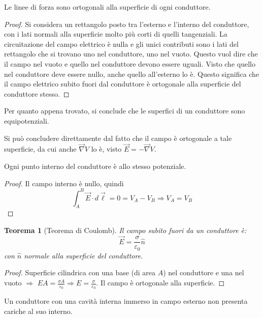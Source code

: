 \documentclass[10pt, a4paper]{scrartcl}
\numberwithin{equation}{subsection}
\theoremstyle{style1}
\newtheorem{teorema}{Teorema}[section]
\newenvironment{boxenv}[1][]{
    \begin{eqbox}[#1]
    }{
   \end{eqbox}
}
\begin{document}
Le linee di forza sono ortogonali alla superficie di ogni conduttore.
\begin{boxenv}[]
\begin{proof}
	Si considera un rettangolo posto tra l'esterno e l'interno del conduttore, con i lati normali alla superficie molto pi\`u corti di quelli tangenziali. La circuitazione del campo elettrico \`e nulla e gli unici contributi sono i lati del rettangolo che si trovano uno nel conduttore, uno nel vuoto. Questo vuol dire che il campo nel vuoto e quello nel conduttore devono essere uguali. Visto che quello nel conduttore deve essere nullo, anche quello all'esterno lo \`e. Questo significa che il campo elettrico subito fuori dal conduttore \`e ortogonale alla superficie del conduttore stesso.
\end{proof}
\end{boxenv}
\noindent Per quanto appena trovato, si conclude che le superfici di un conduttore sono equipotenziali.
\begin{boxenv}[]
	Si pu\`o concludere direttamente dal fatto che il campo \`e ortogonale a tale superficie, da cui anche $\vec{\nabla }V$ lo \`e, visto $\vec{E} = - \vec{\nabla }V$.
\end{boxenv}
\noindent Ogni punto interno del conduttore \`e allo stesso potenziale.
\begin{boxenv}
	\begin{proof}
		Il campo interno \`e nullo, quindi 
		\[
		\int_{A} ^B \vec{E}\cdot d\vec{\ell } = 0 = V_A - V_B \Rightarrow V_A = V_B
		\] 
	\end{proof}
\end{boxenv}
\begin{teorema}
	[Teorema di Coulomb]
	Il campo subito fuori da un conduttore \`e:
	\begin{equation}
		\vec{E} = \frac{\sigma}{\varepsilon _0} \hat{n}
	\end{equation}
	con $\hat{n}$ normale alla superficie del conduttore.
\end{teorema}
\begin{boxenv}[]
\begin{proof}
	Superficie cilindrica con una base (di area $A$) nel conduttore e una nel vuoto $\Rightarrow $ $EA = \frac{\sigma A}{\varepsilon _0}\Rightarrow E = \frac{\sigma}{\varepsilon _0}$. Il campo \`e ortogonale alla superficie.
\end{proof}
\end{boxenv}
\noindent Un conduttore con una cavit\`a interna immerso in campo esterno non presenta cariche al suo interno.
\end{document}
